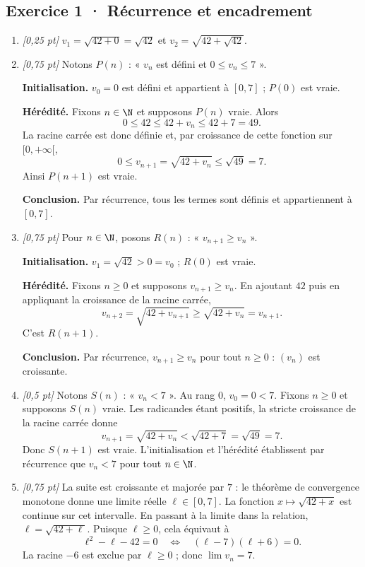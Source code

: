 \subsection*{Exercice 1 · Récurrence et encadrement}\begin{enumerate}

\item \textit{[0,25 pt]} $v_1=\sqrt{42+0}=\sqrt{42}$ et $v_2=\sqrt{42+\sqrt{42}}$.

\item \textit{[0,75 pt]} Notons $P(n)$ : « $v_n$ est défini et $0\le v_n\le 7$ ».
\par\smallskip\textbf{Initialisation.} $v_0=0$ est défini et appartient à $[0,7]$ ; $P(0)$ est vraie.
\par\smallskip\textbf{Hérédité.} Fixons $n\in\N$ et supposons $P(n)$ vraie. Alors
\[0\le 42\le 42+v_n\le 42+7=49.\]
La racine carrée est donc définie et, par croissance de cette fonction sur $[0,+\infty[$,
\[0\le v_{n+1}=\sqrt{42+v_n}\le\sqrt{49}=7.\]
Ainsi $P(n+1)$ est vraie.
\par\smallskip\textbf{Conclusion.} Par récurrence, tous les termes sont définis et appartiennent à $[0,7]$.

\item \textit{[0,75 pt]} Pour $n\in\N$, posons $R(n)$ : « $v_{n+1}\ge v_n$ ».
\par\smallskip\textbf{Initialisation.} $v_1=\sqrt{42}>0=v_0$ ; $R(0)$ est vraie.
\par\smallskip\textbf{Hérédité.} Fixons $n\ge0$ et supposons $v_{n+1}\ge v_n$. En ajoutant $42$ puis en appliquant la croissance de la racine carrée,
\[v_{n+2}=\sqrt{42+v_{n+1}}\ge\sqrt{42+v_n}=v_{n+1}.\]
C'est $R(n+1)$.
\par\smallskip\textbf{Conclusion.} Par récurrence, $v_{n+1}\ge v_n$ pour tout $n\ge0$ : $(v_n)$ est croissante.

\item \textit{[0,5 pt]} Notons $S(n)$ : « $v_n<7$ ». Au rang $0$, $v_0=0<7$.
Fixons $n\ge0$ et supposons $S(n)$ vraie. Les radicandes étant positifs, la stricte croissance de la racine carrée donne
\[v_{n+1}=\sqrt{42+v_n}<\sqrt{42+7}=\sqrt{49}=7.\]
Donc $S(n+1)$ est vraie. L'initialisation et l'hérédité établissent par récurrence que $v_n<7$ pour tout $n\in\N$.

\item \textit{[0,75 pt]} La suite est croissante et majorée par $7$ : le théorème de convergence monotone donne une limite réelle $\ell\in[0,7]$.
La fonction $x\mapsto\sqrt{42+x}$ est continue sur cet intervalle. En passant à la limite dans la relation, $\ell=\sqrt{42+\ell}$. Puisque $\ell\ge0$, cela équivaut à
\[\ell^2-\ell-42=0\quad\Longleftrightarrow\quad(\ell-7)(\ell+6)=0.\]
La racine $-6$ est exclue par $\ell\ge0$ ; donc $\lim v_n=7$.


\end{enumerate}
